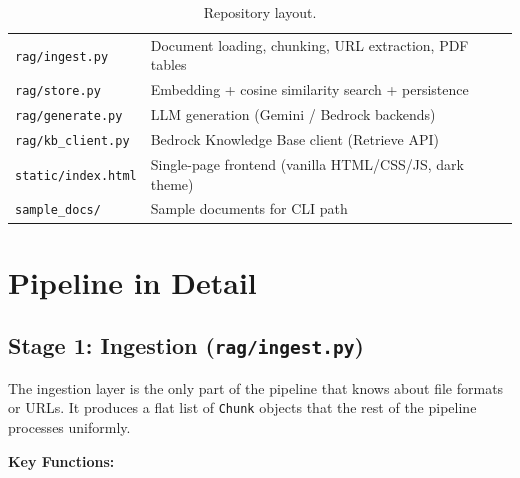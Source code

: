 \documentclass[11pt,a4paper]{paper}
\begin{document}
\begin{table}[h]
\begin{tabular}{>{\ttfamily}p{5.0cm} >{\raggedright\arraybackslash}p{9.5cm}}
\texttt{rag/ingest.py} & Document loading, chunking, URL extraction, PDF tables \\
\texttt{rag/store.py} & Embedding + cosine similarity search + persistence \\
\texttt{rag/generate.py} & LLM generation (Gemini / Bedrock backends) \\
\texttt{rag/kb\_client.py} & Bedrock Knowledge Base client (Retrieve API) \\
\texttt{static/index.html} & Single-page frontend (vanilla HTML/CSS/JS, dark theme) \\
\texttt{sample\_docs/} & Sample documents for CLI path \\
\bottomrule
\end{tabular}
\caption{Repository layout.}
\label{tab:repo}
\end{table}

\section{Pipeline in Detail}
\label{sec:pipeline}

\subsection{Stage 1: Ingestion (\texttt{rag/ingest.py})}

The ingestion layer is the only part of the pipeline that knows about file formats or URLs. It produces a flat list of \texttt{Chunk} objects that the rest of the pipeline processes uniformly.

\textbf{Key Functions:}
\end{document}
